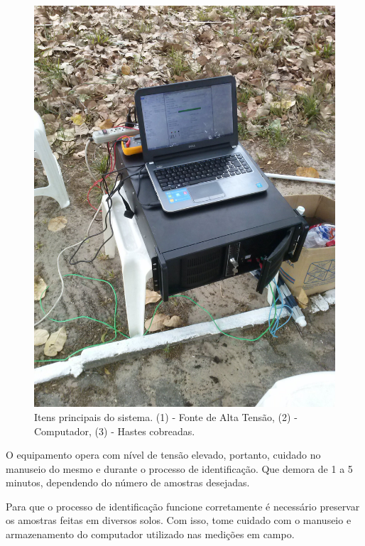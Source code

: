 \documentclass[a4paper, 10pt]{article}
\begin{document}
\begin{figure}[!h]
        \caption{\label{fig_fonte}Itens principais do sistema. (1) - Fonte de Alta Tensão, (2) - Computador, (3) - Hastes cobreadas.}
	    \begin{center}
	        \includegraphics[scale=0.1]{../fotos/CAM00189.jpg}
	    \end{center}
\end{figure}

O equipamento opera com nível de tensão elevado, portanto, cuidado no 
manuseio do mesmo e durante o processo de identificação. Que demora de 
1 a 5 minutos, dependendo do número de amostras desejadas.

Para que o processo de identificação funcione corretamente é necessário 
preservar os amostras feitas em diversos solos. Com isso, tome cuidado
com o manuseio e armazenamento do computador utilizado nas medições em 
campo.

\end{document}
